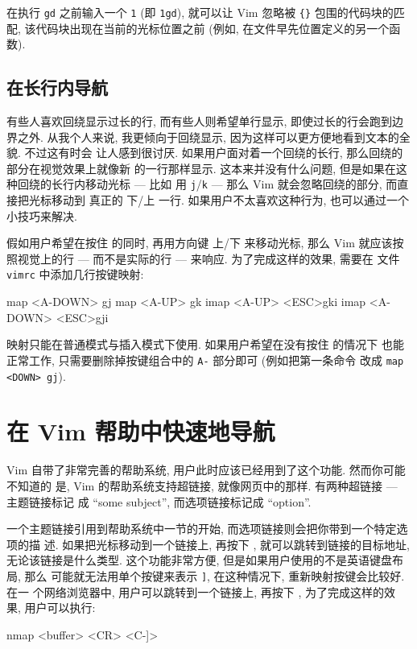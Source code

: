 \begin{tips}
    在执行 \texttt{gd} 之前输入一个 \texttt{1} (即 \texttt{1gd}), 就可以让 Vim 
    忽略被 \verb'{}' 包围的代码块的匹配, 该代码块出现在当前的光标位置之前
    (例如, 在文件早先位置定义的另一个函数).
\end{tips}

\subsection{在长行内导航}
\label{subsec:navigating_long_lines}

有些人喜欢回绕显示过长的行, 而有些人则希望单行显示, 即使过长的行会跑到边界之外.
从我个人来说, 我更倾向于回绕显示, 因为这样可以更方便地看到文本的全貌. 不过这有时会
让人感到很讨厌. 如果用户面对着一个回绕的长行, 那么回绕的部分在视觉效果上就像新
的一行那样显示. 这本来并没有什么问题, 但是如果在这种回绕的长行内移动光标 --- 比如 
用 \texttt{j}/\texttt{k} --- 那么 Vim 就会忽略回绕的部分, 而直接把光标移动到
真正的 下/上 一行. 如果用户不太喜欢这种行为, 也可以通过一个小技巧来解决.

假如用户希望在按住  的同时, 再用方向键 上/下 来移动光标, 那么 Vim 
就应该按照视觉上的行 --- 而不是实际的行 --- 来响应. 为了完成这样的效果, 需要在
文件 \texttt{vimrc} 中添加几行按键映射:
\begin{vimcmd}
map <A-DOWN> gj
map <A-UP> gk
imap <A-UP> <ESC>gki
imap <A-DOWN> <ESC>gji
\end{vimcmd}

映射只能在普通模式与插入模式下使用. 如果用户希望在没有按住  的情况下
也能正常工作, 只需要删除掉按键组合中的 \texttt{A-} 部分即可 (例如把第一条命令
改成 \texttt{map <DOWN> gj}).

\section{在 Vim 帮助中快速地导航}
\label{sec:faster_navigation_in_vim_help}

Vim 自带了非常完善的帮助系统, 用户此时应该已经用到了这个功能. 然而你可能不知道的
是, Vim 的帮助系统支持超链接, 就像网页中的那样. 有两种超链接 --- 主题链接标记
成 ``some subject'', 而选项链接标记成 ``option''.

一个主题链接引用到帮助系统中一节的开始, 而选项链接则会把你带到一个特定选项的描
述. 如果把光标移动到一个链接上, 再按下 \key{Ctrl+]}, 就可以跳转到链接的目标地址,
无论该链接是什么类型. 这个功能非常方便, 但是如果用户使用的不是英语键盘布局, 那么
可能就无法用单个按键来表示 \texttt{]}, 在这种情况下, 重新映射按键会比较好. 在一
个网络浏览器中, 用户可以跳转到一个链接上, 再按下 , 为了完成这样的效 
果, 用户可以执行:
\begin{vimcmd}
nmap <buffer> <CR> <C-]>
\end{vimcmd}

